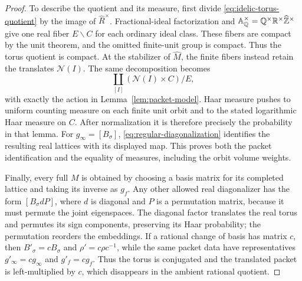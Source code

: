 \begin{proof}
To describe the quotient and its measure, first divide
\eqref{eq:idelic-torus-quotient} by the image of
$\widehat R^\times$. Fractional-ideal factorization and
$\mathbb A_\mathbb Q^\times
=\mathbb Q^\times\mathbb R^\times\widehat{\mathbb Z}^\times$
give one real fiber $E\backslash C$ for each ordinary ideal class.
These fibers are compact by the unit theorem, and the omitted
finite-unit group is compact. Thus the torus quotient is compact.
At the stabilizer of $\widehat M$, the finite fibers instead retain
the translates $\mathcal N(I)$. The same decomposition becomes
\[
 \coprod_{[I]}(\mathcal N(I)\times C)/E,
\]
with exactly the action in Lemma~\ref{lem:packet-model}.
Haar measure pushes to uniform counting measure on each finite
unit orbit and to the stated logarithmic Haar measure on $C$.
After normalization it is therefore precisely the probability in
that lemma. For $g_\infty=[B_\sigma]$,
\eqref{eq:regular-diagonalization} identifies the resulting real
lattices with its displayed map. This proves both the packet
identification and the equality of measures, including the orbit
volume weights.

Finally, every full $M$ is obtained by choosing a basis matrix for
its completed lattice and taking its inverse as $g_f$.
Any other allowed real diagonalizer has the form $[B_\sigma dP]$,
where $d$ is diagonal and $P$ is a permutation matrix, because it
must permute the joint eigenspaces. The diagonal factor translates
the real torus and permutes its sign components, preserving its
Haar probability; the permutation reorders the embeddings.
If a rational change of basis has matrix $c$, then
$B'_\sigma=cB_\sigma$ and $\rho'=c\rho c^{-1}$, while the same
packet data have representatives $g'_\infty=cg_\infty$ and
$g'_f=cg_f$. Thus the torus is conjugated and the translated packet
is left-multiplied by $c$, which disappears in the ambient rational quotient.
\end{proof}

